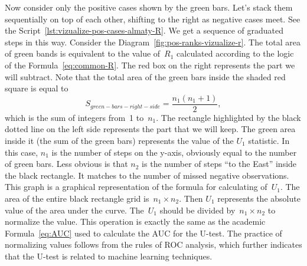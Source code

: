 \documentclass[]{scrreprt}
\begin{document}
Now consider only the positive cases shown by the green bars. Let's stack them sequentially on top of each other, shifting to the right as negative cases meet. See the Script~\ref{lst:vizualize-pos-cases-almaty-R}. We get a sequence of graduated steps in this way. Consider the Diagram~\ref{fig:pos-ranks-vizualize-r}. The total area of green bands is equivalent to the value of~$R_{1}$ calculated according to the logic of the  Formula~\ref{eq:common-R}. The red box on the right represents the part we will subtract. Note that the total area of the green bars inside the shaded red square is equal to
\begin{equation}\label{eq:R-1}
S_{green-bars-right-side}=\frac{n_{1}(n_{1}+1)}{2},
\end{equation}
which is the sum of integers from~1 to~$n_{1}$. The rectangle highlighted by the black dotted line on the left side represents the part that we will keep. The green area inside it (the sum of the green bars) represents the value of the $U_{1}$ statistic. In this case, $n_{1}$ is the number of steps on the y-axis, obviously equal to the number of green bars. Less obvious is that $n_{2}$ is the number of steps ``to the East'' inside the black rectangle. It matches to the number of missed negative observations. This graph is a graphical representation of the formula for calculating of~$U_{1}$. The area of the entire black rectangle grid is~$n_{1} \times n_{2}$. Then $U_{1}$ represents the absolute value of the area under the curve. The~$U_{1}$ should be divided by~$n_{1} \times n_{2}$ to normalize the value. This operation is exactly the same as the academic Formula~\ref{eq:AUC} used to calculate the AUC for the U-test. The practice of normalizing values follows from the rules of ROC analysis, which further indicates that the U-test is related to machine learning techniques.
\end{document}

